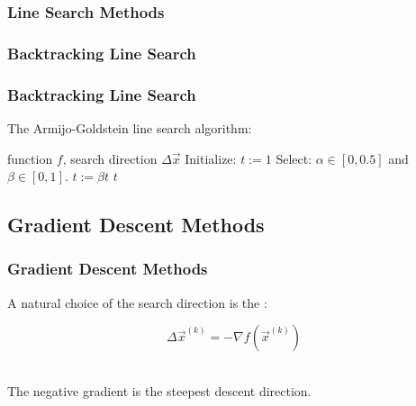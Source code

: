 \begin{frame}
  \frametitle{Line Search Methods \cont}
  
  
  \begin{center}
    \resizebox{.7\linewidth}{!}{
        
    }
  \end{center}
\end{frame}


\begin{frame}
  \frametitle{Backtracking Line Search}

  \begin{center}
  \end{center}
\end{frame}


\begin{frame}
  \frametitle{Backtracking Line Search \cont}

  The Armijo-Goldstein line search algorithm: \\[0.5cm]

  \begin{algorithmic}
    \STATE {} function $f$, search direction $\Delta\vec x$
    \STATE Initialize: $t:=1$
    \STATE Select: $\alpha\in [0,0.5]$ and $\beta\in [0,1]$.
      \STATE $t := \beta t$
    \ENDWHILE
    \STATE {} $t$
  \end{algorithmic}
\end{frame}


\subsection{Gradient Descent Methods}

\begin{frame}
  \frametitle{Gradient Descent Methods}

  A natural choice of the search direction is the :
  
  \begin{displaymath}
    \Delta \vec x^{(k)} = -\nabla f(\vec x^{(k)})
  \end{displaymath}
  \vspace{1cm}

  \\[.15cm]
  
  The negative gradient is the steepest descent direction.
\end{frame}


